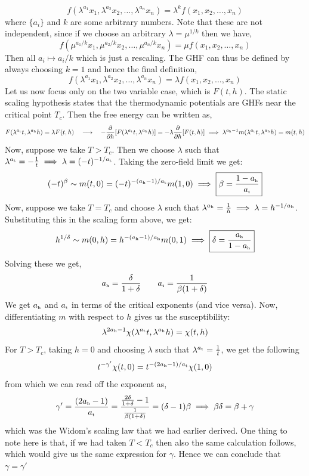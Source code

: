 $$f(\lambda^{a_1} x_1,\lambda^{a_2} x_2  ,\ldots, \lambda^{a_n}x_n) = \lambda^k f(x_1, x_2 ,\ldots, x_n)$$
where $\{a_i\}$ and $k$ are some arbitrary numbers. Note that these are not independent, since if we choose an arbitrary $\lambda = \mu^{1/k}$ then we have, 
$$f(\mu^{a_1/k} x_1,\mu^{a_2/k} x_2  ,\ldots, \mu^{a_n/k}x_n) = \mu f(x_1, x_2 ,\ldots, x_n)$$
Then all $a_i \mapsto a_i/k$ which is just a rescaling. The GHF can thus be defined by always choosing $k=1$ and hence the final definition,
$$f(\lambda^{a_1} x_1,\lambda^{a_2} x_2  ,\ldots, \lambda^{a_n}x_n) = \lambda f(x_1, x_2 ,\ldots, x_n)$$
Let us now focus only on the two variable case, which is $F(t,h)$. The static scaling hypothesis states that the thermodynamic potentials are GHFs near the critical point $T_c$. Then the free energy can be written as, 
$$F(\lambda^{a_{\text{\tiny t}}}t, \lambda^{a_{\text{\tiny h}}}h) = \lambda F(t,h)\quad \longrightarrow \quad -\pdv{h}\qty[F(\lambda^{a_{\text{\tiny t}}}t, \lambda^{a_{\text{\tiny h}}}h)] = -\lambda \pdv{h}\qty[F(t,h)] \implies \lambda^{a_{\text{\tiny h}}-1} m(\lambda^{a_{\text{\tiny t}}}t, \lambda^{a_{\text{\tiny h}}}h) =m(t,h)$$
Now, suppose we take $T>T_c$. Then we choose $\lambda$ such that $\lambda^{a_{\text{\tiny t}}} = -\frac{1}{t}\implies \lambda = (-t)^{-1/a_{\text{\tiny t}}}$. Taking the zero-field limit we get: 
$$(-t)^{\beta} \sim m(t,0) = (-t)^{-(a_{\text{\tiny h}}-1)/a_{\text{\tiny t}}}m(1,0) \implies \boxed{\beta = \frac{1-a_{\text{\tiny h}}}{a_{\text{\tiny t}}}}$$ 
Now, suppose we take $T=T_c $ and choose $\lambda$ such that $\lambda^{a_{\text{\tiny h}}}=\frac{1}{h}\implies \lambda = h^{-1/a_{\text{\tiny h}}}$. Substituting this in the scaling form above, we get:
$$h^{1/\delta} \sim m(0,h) = h^{-(a_{\text{\tiny h}}-1)/a_{\text{\tiny h}}}m(0,1)\implies \boxed{\delta = \frac{a_{\text{\tiny h}}}{1-a_{\text{\tiny h}}}}$$
Solving these we get,
\begin{equation}
    a_{\text{\tiny h}} = \frac{\delta}{1+\delta} \qquad a_{\text{\tiny t}} = \frac{1}{\beta(1+\delta)} 
\end{equation}
We get $a_{\text{\tiny h}}$ and $a_{\text{\tiny t}}$ in terms of the critical exponents (and vice versa). Now, differentiating $m$ with respect to $h$ gives us the susceptibility:
\begin{align*}
   \lambda^{2a_{\text{\tiny h}}-1} \chi(\lambda^{a_{\text{\tiny t}}}t, \lambda^{a_{\text{\tiny h}}}h) = \chi(t,h)
\end{align*}
For $T>T_c$, taking $h=0$ and choosing $\lambda$ such that $\lambda^{a_{\text{\tiny t}}}=\frac{1}{t}$, we get the following
$$t^{-\gamma'}\chi(t,0) = t^{-(2a_{\text{\tiny h}}-1)/a_{\text{\tiny t}}} \chi(1,0) $$
from which we can read off the exponent as,
$$\gamma' =  \frac{(2a_{\text{\tiny h}}-1)}{a_{\text{\tiny t}}}= \frac{\frac{2\delta}{1+\delta}-1}{\frac{1}{\beta(1+\delta)}} = (\delta-1)\beta \implies \beta \delta = \beta+\gamma$$
which was the Widom's scaling law that we had earlier derived.  One thing to note here is that, if we had taken $T<T_c$ then also the same calculation follows, which would give us the same expression for $\gamma$. Hence we can conclude that $\gamma=\gamma'$

